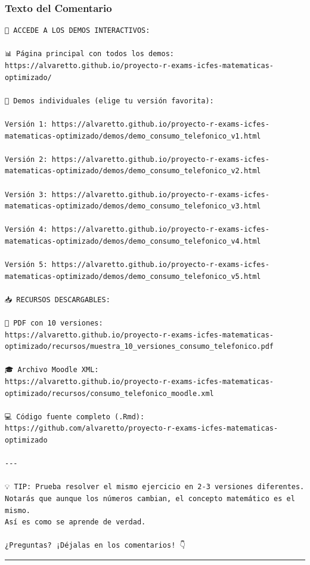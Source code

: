 \documentclass[
]{article}
\begin{document}
\subsubsection{Texto del Comentario}\label{texto-del-comentario}

\begin{verbatim}
🔗 ACCEDE A LOS DEMOS INTERACTIVOS:

📊 Página principal con todos los demos:
https://alvaretto.github.io/proyecto-r-exams-icfes-matematicas-optimizado/

🎯 Demos individuales (elige tu versión favorita):

Versión 1: https://alvaretto.github.io/proyecto-r-exams-icfes-matematicas-optimizado/demos/demo_consumo_telefonico_v1.html

Versión 2: https://alvaretto.github.io/proyecto-r-exams-icfes-matematicas-optimizado/demos/demo_consumo_telefonico_v2.html

Versión 3: https://alvaretto.github.io/proyecto-r-exams-icfes-matematicas-optimizado/demos/demo_consumo_telefonico_v3.html

Versión 4: https://alvaretto.github.io/proyecto-r-exams-icfes-matematicas-optimizado/demos/demo_consumo_telefonico_v4.html

Versión 5: https://alvaretto.github.io/proyecto-r-exams-icfes-matematicas-optimizado/demos/demo_consumo_telefonico_v5.html

📥 RECURSOS DESCARGABLES:

📄 PDF con 10 versiones:
https://alvaretto.github.io/proyecto-r-exams-icfes-matematicas-optimizado/recursos/muestra_10_versiones_consumo_telefonico.pdf

🎓 Archivo Moodle XML:
https://alvaretto.github.io/proyecto-r-exams-icfes-matematicas-optimizado/recursos/consumo_telefonico_moodle.xml

💻 Código fuente completo (.Rmd):
https://github.com/alvaretto/proyecto-r-exams-icfes-matematicas-optimizado

---

💡 TIP: Prueba resolver el mismo ejercicio en 2-3 versiones diferentes.
Notarás que aunque los números cambian, el concepto matemático es el mismo.
Así es como se aprende de verdad.

¿Preguntas? ¡Déjalas en los comentarios! 👇
\end{verbatim}

\begin{center}\rule{0.5\linewidth}{0.5pt}\end{center}
\end{document}
